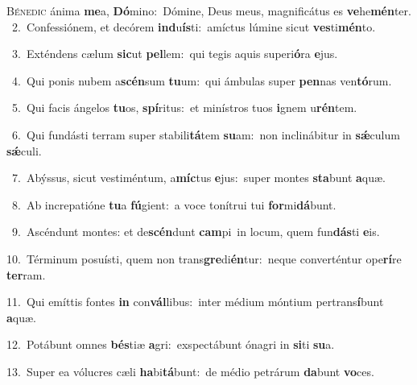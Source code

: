 \lettrine{\initial\textcolor{\initialcolor}{B}}{énedic} ánima \textbf{me}\-a, \textbf{Dó}\-mino:~\star Dómine, Deus meus, magnificátus es \textbf{ve}\-he\-\textbf{mén}\-ter.\\
{\numbfont\textcolor{\numbcolor}{~2.}}~Confessiónem, et decórem \textbf{ind}\-u\-\textbf{ís}\-ti:~\star amíctus lúmine sicut \textbf{ves}\-ti\-\textbf{mén}\-to.\par
{\numbfont\textcolor{\numbcolor}{~3.}}~Exténdens cælum \textbf{sic}\-ut \textbf{pel}\-lem:~\star qui tegis aquis superi\-\textbf{ó}\-ra \textbf{e}\-jus.\par
{\numbfont\textcolor{\numbcolor}{~4.}}~Qui ponis nubem a\-\textbf{scén}\-sum \textbf{tu}\-um:~\star qui ámbulas super \textbf{pen}\-nas ven\-\textbf{tó}\-rum.\par
{\numbfont\textcolor{\numbcolor}{~5.}}~Qui facis ángelos \textbf{tu}\-os, \textbf{spí}\-ritus:~\star et minístros tuos \textbf{i}\-gnem u\-\textbf{rén}\-tem.\par
{\numbfont\textcolor{\numbcolor}{~6.}}~Qui fundásti terram super stabili\-\textbf{tá}\-tem \textbf{su}\-am:~\star non inclinábitur in \textbf{sǽ}\-culum \textbf{sǽ}\-culi.\par
{\numbfont\textcolor{\numbcolor}{~7.}}~Abýssus, sicut vestiméntum, a\-\textbf{míc}\-tus \textbf{e}\-jus:~\star super montes \textbf{sta}\-bunt \textbf{a}\-quæ.\par
{\numbfont\textcolor{\numbcolor}{~8.}}~Ab increpatióne \textbf{tu}\-a \textbf{fú}\-gient:~\star a voce tonítrui tui \textbf{for}\-mi\-\textbf{dá}\-bunt.\par
{\numbfont\textcolor{\numbcolor}{~9.}}~Ascéndunt montes: et de\-\textbf{scén}\-dunt \textbf{cam}\-pi~\star in locum, quem fun\-\textbf{dás}\-ti \textbf{e}\-is.\par
{\numbfont\textcolor{\numbcolor}{10.}}~Términum posuísti, quem non trans\-\textbf{gre}\-di\-\textbf{én}\-tur:~\star neque converténtur ope\-\textbf{rí}\-re \textbf{ter}\-ram.\par
{\numbfont\textcolor{\numbcolor}{11.}}~Qui emíttis fontes \textbf{in} con\-\textbf{vál}\-libus:~\star inter médium móntium pertrans\-\textbf{í}\-bunt \textbf{a}\-quæ.\par
{\numbfont\textcolor{\numbcolor}{12.}}~Potábunt omnes \textbf{bés}\-tiæ \textbf{a}\-gri:~\star exspectábunt ónagri in \textbf{si}\-ti \textbf{su}\-a.\par
{\numbfont\textcolor{\numbcolor}{13.}}~Super ea vólucres cæli \textbf{ha}\-bi\-\textbf{tá}\-bunt:~\star de médio petrárum \textbf{da}\-bunt \textbf{vo}\-ces.\par
